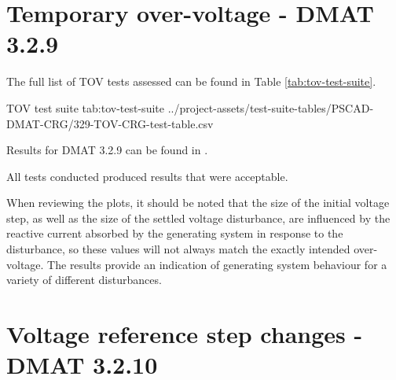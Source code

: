 \documentclass{../grid-link-report}
\newcommand{\projectassetsdir}{../project-assets}
\begin{document}
	
	
	\section{Temporary over-voltage - DMAT 3.2.9}
	
	
	
	
	The full list of \ac{TOV} tests assessed can be found in Table \ref{tab:tov-test-suite}.
	
	{
		\fontsize{6}{8}\selectfont
		\autoscaledlongtable
		{TOV test suite}
		{tab:tov-test-suite}
		{\projectassetsdir/test-suite-tables/PSCAD-DMAT-CRG/329-TOV-CRG-test-table.csv}
	}
	
	Results for DMAT 3.2.9 can be found in .
	
	All tests conducted produced results that were acceptable. 
	
	When reviewing the plots, it should be noted that the size of the initial voltage step, as well as the size of the settled voltage disturbance, are influenced by the reactive current absorbed by the generating system in response to the disturbance, so these values will not always match the exactly intended over-voltage. The results provide an indication of generating system behaviour for a variety of different disturbances.
	
	\section{Voltage reference step changes - DMAT 3.2.10}	
	\label{sec:vref-step-changes}
	
	
	
	
	
	
\end{document}
